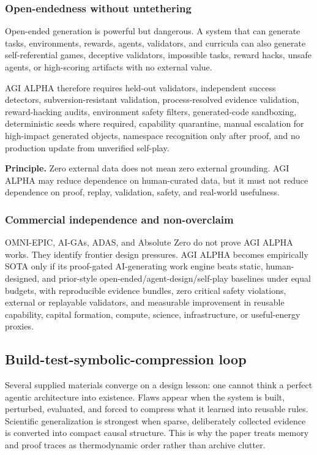 \subsubsection{Open-endedness without
untethering}\label{open-endedness-without-untethering}

Open-ended generation is powerful but dangerous. A system that can
generate tasks, environments, rewards, agents, validators, and curricula
can also generate self-referential games, deceptive validators,
impossible tasks, reward hacks, unsafe agents, or high-scoring artifacts
with no external value.

AGI ALPHA therefore requires held-out validators, independent success
detectors, subversion-resistant validation, process-resolved evidence
validation, reward-hacking audits, environment safety filters,
generated-code sandboxing, deterministic seeds where required,
capability quarantine, manual escalation for high-impact generated
objects, namespace recognition only after proof, and no production
update from unverified self-play.

\textbf{Principle.} Zero external data does not mean zero external
grounding. AGI ALPHA may reduce dependence on human-curated data, but it
must not reduce dependence on proof, replay, validation, safety, and
real-world usefulness.

\subsubsection{Commercial independence and
non-overclaim}\label{commercial-independence-and-non-overclaim-1}

OMNI-EPIC, AI-GAs, ADAS, and Absolute Zero do not prove AGI ALPHA works.
They identify frontier design pressures. AGI ALPHA becomes empirically
SOTA only if its proof-gated AI-generating work engine beats static,
human-designed, and prior-style open-ended/agent-design/self-play
baselines under equal budgets, with reproducible evidence bundles, zero
critical safety violations, external or replayable validators, and
measurable improvement in reusable capability, capital formation,
compute, science, infrastructure, or useful-energy proxies.

\subsection{Build-test-symbolic-compression
loop}\label{build-test-symbolic-compression-loop}

Several supplied materials converge on a design lesson: one cannot think
a perfect agentic architecture into existence. Flaws appear when the
system is built, perturbed, evaluated, and forced to compress what it
learned into reusable rules. Scientific generalization is strongest when
sparse, deliberately collected evidence is converted into compact causal
structure. This is why the paper treats memory and proof traces as
thermodynamic order rather than archive clutter.

